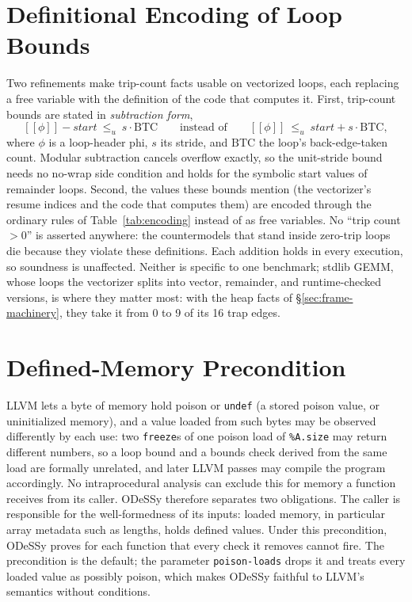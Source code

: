 \documentclass[acmsmall,screen,nonacm]{acmart}
\newcommand{\odessy}{ODeSSy}
\newcommand{\tool}{\odessy}
\newcommand{\den}[1]{[\![#1]\!]}
\begin{document}
\section{Definitional Encoding of Loop Bounds}
\label{sec:app-defs}
Two refinements make trip-count facts usable on vectorized loops, each
replacing a free variable with the definition of the code that computes
it. First,
trip-count bounds are stated in \emph{subtraction form},
\[
\den{\phi} - \mathit{start} \ \le_u\ s \cdot \mathrm{BTC}
\qquad\text{instead of}\qquad
\den{\phi} \ \le_u\ \mathit{start} + s \cdot \mathrm{BTC},
\]
where $\phi$ is a loop-header phi, $s$ its stride, and $\mathrm{BTC}$
the loop's back-edge-taken count. Modular subtraction cancels overflow
exactly, so the unit-stride bound needs no no-wrap side condition and
holds for the symbolic start values of remainder loops. Second, the
values these bounds mention (the vectorizer's resume indices and the code
that computes them) are encoded through the ordinary rules of
Table~\ref{tab:encoding} instead of as free variables. No ``trip count
$>0$'' is asserted anywhere: the countermodels that stand inside
zero-trip loops die because they violate these definitions. Each
addition holds in every execution, so soundness is unaffected. Neither
is specific to one benchmark; stdlib GEMM, whose loops the vectorizer
splits into vector, remainder, and runtime-checked versions, is where
they matter most: with the heap facts of \S\ref{sec:frame-machinery},
they take it from 0 to 9 of its 16 trap edges.

\section{Defined-Memory Precondition}
\label{sec:app-defined-memory}
LLVM lets a byte of memory hold poison or \texttt{undef} (a stored poison
value, or uninitialized memory), and a value loaded from such bytes may be
observed differently by each use: two \texttt{freeze}s of one poison load of
\texttt{\%A.size} may return different numbers, so a loop bound and a bounds
check derived from the same load are formally unrelated, and later LLVM
passes may compile the program accordingly. No intraprocedural analysis can
exclude this for memory a function receives from its caller. \tool{}
therefore separates two obligations. The caller is responsible for the
well-formedness of its inputs: loaded memory, in particular array metadata
such as lengths, holds defined values. Under this precondition, \tool{}
proves for each function that every check it removes cannot fire. The
precondition is the default; the parameter \texttt{poison-loads} drops it
and treats every loaded value as possibly poison, which makes \tool{}
faithful to LLVM's semantics without conditions.
\end{document}
